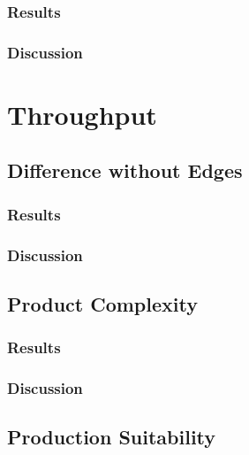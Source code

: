 \subsubsection{Results\label{subse:resultsNodeSize}}

\subsubsection{Discussion\label{subse:discussionNodeSize}}

\section{Throughput\label{se:throughput}}

\subsection{Difference without Edges\label{subse:differeceWithoutEdges}}

\subsubsection{Results\label{subse:resultsDifferenceWithoutEdges}}

\subsubsection{Discussion\label{subse:discussionWithoutEdges}}

\subsection{Product Complexity\label{subse:productComplexity} }

\subsubsection{Results\label{subse:resultsProductComplexity}}

\subsubsection{Discussion\label{subse:discussionProductComplexity}}

\subsection{Production Suitability\label{subse:productionSuitability} }


